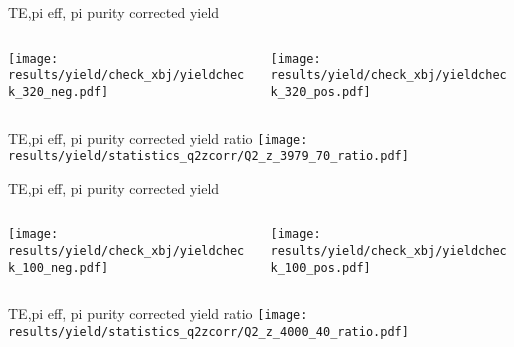\begin{frame}{TE,pi eff, pi purity corrected yield}
\begin{columns}
\begin{column}[T]{0.5\textwidth}
\texttt{[image: results/yield/check\_xbj/yieldcheck\_320\_neg.pdf]}
\end{column}
\begin{column}[T]{0.5\textwidth}
\texttt{[image: results/yield/check\_xbj/yieldcheck\_320\_pos.pdf]}
\end{column}
\end{columns}
\end{frame}
\begin{frame}{TE,pi eff, pi purity corrected yield ratio}
\texttt{[image: results/yield/statistics\_q2zcorr/Q2\_z\_3979\_70\_ratio.pdf]}
\end{frame}
\begin{frame}{TE,pi eff, pi purity corrected yield}
\begin{columns}
\begin{column}[T]{0.5\textwidth}
\texttt{[image: results/yield/check\_xbj/yieldcheck\_100\_neg.pdf]}
\end{column}
\begin{column}[T]{0.5\textwidth}
\texttt{[image: results/yield/check\_xbj/yieldcheck\_100\_pos.pdf]}
\end{column}
\end{columns}
\end{frame}
\begin{frame}{TE,pi eff, pi purity corrected yield ratio}
\texttt{[image: results/yield/statistics\_q2zcorr/Q2\_z\_4000\_40\_ratio.pdf]}
\end{frame}
